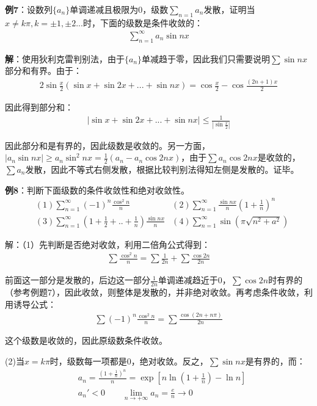 \documentclass{ctexart}
\let\oldtextbf\textbf
\renewcommand{\textbf}[1]{\textcolor{brown!50!red}{\oldtextbf{#1}}}
\begin{document}
\textbf{\color{brown!50!red}例7}：设数列$\{a_n\}$单调递减且极限为0，级数$\sum_{n=1}a_n$发散，证明当$x\neq k\pi,k=\pm1,\pm2...$时，下面的级数是条件收敛的：
\begin{align*}
    \sum_{n=1}^\infty a_n\sin nx
\end{align*}

\textbf{\color{brown!50!red}解}：使用狄利克雷判别法，由于$\{a_n\}$单减趋于零，因此我们只需要说明$\sum \sin nx$部分和有界。由于：
\begin{align*}
    2\sin\frac{x}{2}(\sin x+\sin 2x+...+\sin nx)=\cos\frac
    {x}{2}-\cos\frac{(2n+1)x}{2}
\end{align*}

因此得到部分和：
\begin{align*}
    |\sin x+\sin 2x+...+\sin nx|\leq\frac{1}{|\sin \frac{x}{2}|}
\end{align*}

因此部分和是有界的，因此级数是收敛的。另一方面，$|a_n\sin nx|\geq a_n\sin^2 nx=\frac{1}{2}(a_n-a_n\cos 2nx)$，由于$\sum a_n\cos 2nx$是收敛的，$\sum a_n$发散，因此不等式右侧发散，根据比较判别法得知左侧是发散的。证毕。

\textbf{\color{brown!50!red}例8}：判断下面级数的条件收敛性和绝对收敛性。
\begin{align*}
    &(1)\sum_{n=1}^\infty (-1)^n\frac{\cos^2 n}{n} &(2)\sum_{n=1}^\infty\frac{\sin nx}{n}(1+\frac{1}{n})^n\\
    &(3)\sum_{n=1}^\infty (1+\frac{1}{2}+..+\frac{1}{n})\frac{\sin nx}{n}&(4)\sum_{n=1}^\infty \sin(\pi\sqrt{n^2+a^2})
\end{align*}

解：（1）先判断是否绝对收敛，利用二倍角公式得到：
\begin{align*} 
  \sum\frac{\cos^2 n}{n}=\sum \frac{1}{2n}+\sum\frac{\cos 2n}{2n}
\end{align*}

前面这一部分是发散的，后边这一部分$\frac{1}{2n}$单调递减趋近于0，$\sum \cos 2n$时有界的（参考例题7），因此收敛，则整体是发散的，并非绝对收敛。再考虑条件收敛，利用诱导公式：
\begin{align*} 
  \sum(-1)^n\frac{\cos^2 n}{n}=\sum \frac{\cos(2n+n\pi)}{2n}   
\end{align*}

这个级数是收敛的，因此原级数条件收敛。

(2)当$x=k\pi$时，级数每一项都是0，绝对收敛。反之，$\sum \sin nx$是有界的，而：
\begin{align*} 
 & a_n=\frac{(1+\frac{1}{n})^n }{n}=\exp[n\ln(1+\frac{1}{n})-\ln n]\\
 &a_n'<0\qquad \lim_{n\to+\infty}a_n=\frac{e}{n}\to 0 
\end{align*}
\end{document}

